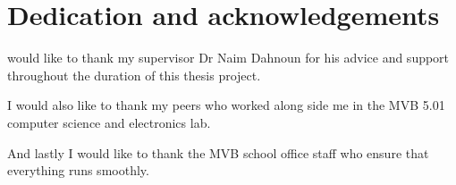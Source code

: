 %
%

\chapter*{Dedication and acknowledgements}
\begin{SingleSpace}
 would like to thank my supervisor Dr Naim Dahnoun for his advice and support throughout the duration of this thesis project. \par
I would also like to thank my peers who worked along side me in the MVB 5.01 computer science and electronics lab. \par
And lastly I would like to thank the MVB school office staff who ensure that everything runs smoothly.
\end{SingleSpace}
\clearpage